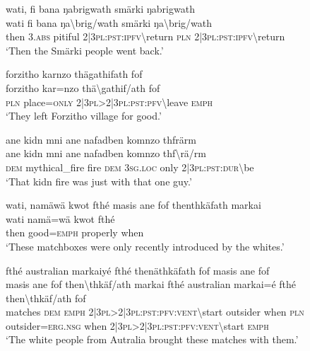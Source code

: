 \ea\label{ex:11:a2575}
wati, fi bana ŋabrigwath smärki ŋabrigwath\\
\gll wati	fi	bana	ŋa{\textbackslash}brig/wath	smärki	ŋa{\textbackslash}brig/wath\\
     then	3.\textsc{abs}	pitiful	2|3\textsc{pl}:\textsc{pst}:\textsc{ipfv}{\textbackslash}return	\textsc{pln}	2|3\textsc{pl}:\textsc{pst}:\textsc{ipfv}{\textbackslash}return\\
\glt `Then the Smärki people went back.'
\z

\ea\label{ex:11:a2576}
forzitho karnzo thägathifath fof\\
\gll forzitho	kar=nzo	thä{\textbackslash}gathif/ath	fof\\
     \textsc{pln}	place=\textsc{only}	2|3\textsc{pl}>2|3\textsc{pl}:\textsc{pst}:\textsc{pfv}{\textbackslash}leave	\textsc{emph}\\
\glt `They left Forzitho village for good.'
\z

\ea\label{ex:11:a2578}
ane kidn mni ane nafadben komnzo thfrärm\\
\gll ane	kidn	mni	ane	nafadben	komnzo	thf{\textbackslash}rä/rm\\
     \textsc{dem}	mythical\_fire	fire	\textsc{dem}	3\textsc{sg}.\textsc{loc}	only	2|3\textsc{pl}:\textsc{pst}:\textsc{dur}{\textbackslash}be\\
\glt `That kidn fire was just with that one guy.'
\z

\ea\label{ex:11:a2579}
wati, namäwä kwot fthé masis ane fof thenthkäfath markai\\
\gll wati	namä=wä	kwot	fthé\\
     then	good=\textsc{emph}	properly	when\\
\glt `These matchboxes were only recently introduced by the whites.'
\z

\ea\label{ex:11:a2580}
fthé australian markaiyé fthé thenäthkäfath fof masis ane fof\\
\gll masis	ane	fof	then{\textbackslash}thkäf/ath	markai	fthé	australian	markai=é	fthé	then{\textbackslash}thkäf/ath	fof\\
     matches	\textsc{dem}	\textsc{emph}	2|3\textsc{pl}>2|3\textsc{pl}:\textsc{pst}:\textsc{pfv}:\textsc{vent}{\textbackslash}start	outsider	when	\textsc{pln}	outsider=\textsc{erg}.\textsc{nsg}	when	2|3\textsc{pl}>2|3\textsc{pl}:\textsc{pst}:\textsc{pfv}:\textsc{vent}{\textbackslash}start	\textsc{emph}\\
\glt `The white people from Autralia brought these matches with them.'
\z

